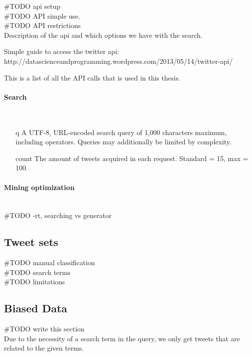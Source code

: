 #TODO api setup\\
#TODO API simple use.\\
#TODO API restrictions\\

Description of the api and which options we have with the search. 

Simple guide to access the twitter api:  http://datascienceandprogramming.wordpress.com/2013/05/14/twitter-api/

This is a list of all the API calls that is used in this thesis.
% 

\paragraph{Search} 
\hspace{0pt}\\

\begin{itemize}
\item[q] A UTF-8, URL-encoded search query of 1,000 characters maximum, including
operators. Queries may additionally be limited by complexity.

\item[count] The amount of tweets acquired in each request. Standard = 15, max
= 100. 

\end{itemize}
%

\paragraph{Mining optimization}
\hspace{0pt}\\

#TODO -rt, searching vs generator\\ 
%

\subsection{Tweet sets}
#TODO manual classification\\
#TODO search terms\\
#TODO limitations\\

\subsection{Biased Data}
#TODO write this section\\
Due to the necessity of a search term in the query, we only get tweets that are
related to the given terms.

